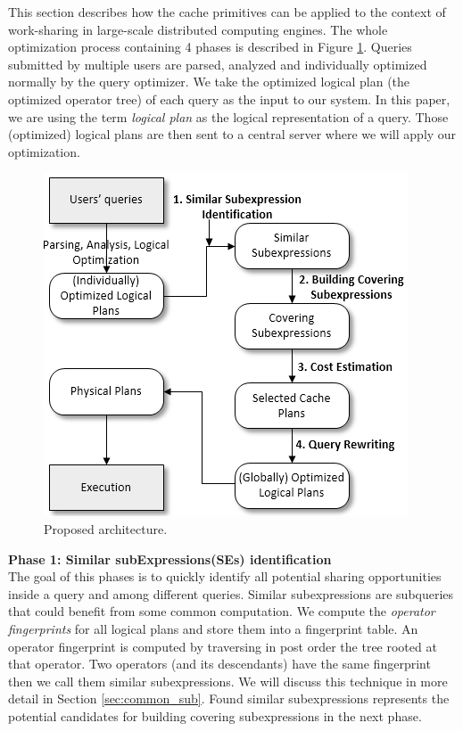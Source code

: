This section describes how the cache primitives can be applied to the context of work-sharing in large-scale distributed computing engines. The whole optimization process containing 4 phases is described in Figure \ref{fig:phases_mqo}. Queries submitted by multiple users are parsed, analyzed and individually optimized normally by the query optimizer. We take the optimized logical plan (the optimized operator tree) of each query as the input to our system. In this paper, we are using the term \emph{logical plan} as the logical representation of a query. Those (optimized) logical plans are then sent to a central server where we will apply our optimization.

\begin{figure}[!htb]
	\centering
 	\includegraphics[scale=0.65]{figures/phases_mqo}
   	\caption{Proposed architecture.} 
   	\label{fig:phases_mqo}
\end{figure}


\textbf{Phase 1: Similar subExpressions(SEs) identification}\\
The goal of this phases is to quickly identify all potential sharing opportunities inside a query and among different queries. Similar subexpressions are subqueries that could benefit from some common computation. We compute the \emph{operator fingerprints} for all logical plans and store them into a fingerprint table. An operator fingerprint is computed by traversing in post order the tree rooted at that operator. Two operators (and its descendants) have the same fingerprint then we call them similar subexpressions. We will discuss this technique in more detail in Section \ref{sec:common_sub}. Found similar subexpressions represents the potential candidates for building covering subexpressions in the next phase.

